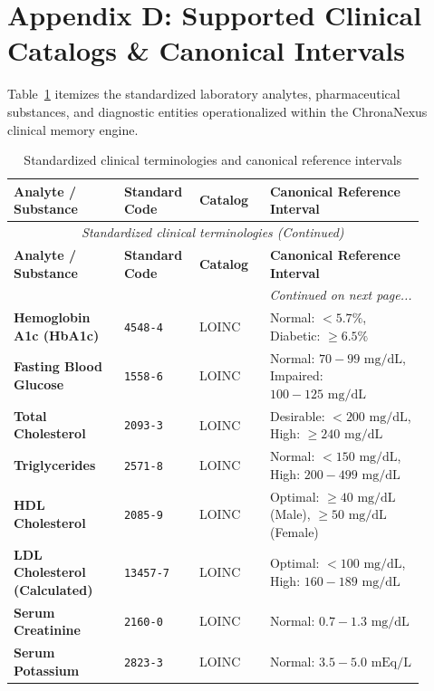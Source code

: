 \section{Appendix D: Supported Clinical Catalogs \& Canonical Intervals}
\label{sec:app_catalogs}

Table~\ref{tab:11_2_catalogs} itemizes the standardized laboratory analytes, pharmaceutical substances, and diagnostic entities operationalized within the ChronaNexus clinical memory engine.

\small
\begin{longtable}{@{}p{0.25\linewidth} p{0.14\linewidth} p{0.16\linewidth} p{0.35\linewidth}@{}}
\caption{Standardized clinical terminologies and canonical reference intervals}\label{tab:11_2_catalogs} \\
\toprule
\textbf{Analyte / Substance} & \textbf{Standard Code} & \textbf{Catalog} & \textbf{Canonical Reference Interval} \\
\midrule
\endfirsthead
\toprule
\multicolumn{4}{c}{\small\textit{Standardized clinical terminologies (Continued)}} \\[4pt]
\midrule
\textbf{Analyte / Substance} & \textbf{Standard Code} & \textbf{Catalog} & \textbf{Canonical Reference Interval} \\
\midrule
\endhead
\midrule
\multicolumn{4}{r}{\footnotesize\textit{Continued on next page...}} \\
\bottomrule
\endfoot
\bottomrule
\endlastfoot
\textbf{Hemoglobin A1c (HbA1c)} & \texttt{4548-4} & LOINC & Normal: $< 5.7\%$, Diabetic: $\ge 6.5\%$ \\
\textbf{Fasting Blood Glucose} & \texttt{1558-6} & LOINC & Normal: $70 - 99\text{ mg/dL}$, Impaired: $100 - 125\text{ mg/dL}$ \\
\textbf{Total Cholesterol} & \texttt{2093-3} & LOINC & Desirable: $< 200\text{ mg/dL}$, High: $\ge 240\text{ mg/dL}$ \\
\textbf{Triglycerides} & \texttt{2571-8} & LOINC & Normal: $< 150\text{ mg/dL}$, High: $200 - 499\text{ mg/dL}$ \\
\textbf{HDL Cholesterol} & \texttt{2085-9} & LOINC & Optimal: $\ge 40\text{ mg/dL}$ (Male), $\ge 50\text{ mg/dL}$ (Female) \\
\textbf{LDL Cholesterol (Calculated)} & \texttt{13457-7} & LOINC & Optimal: $< 100\text{ mg/dL}$, High: $160 - 189\text{ mg/dL}$ \\
\textbf{Serum Creatinine} & \texttt{2160-0} & LOINC & Normal: $0.7 - 1.3\text{ mg/dL}$ \\
\textbf{Serum Potassium} & \texttt{2823-3} & LOINC & Normal: $3.5 - 5.0\text{ mEq/L}$ \\

\end{longtable}
